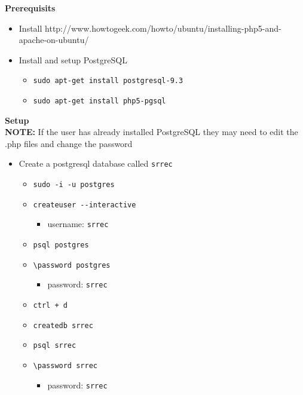 \documentclass[10pt, a4paper, onecolumn]{scrartcl}
\begin{document}
	\textbf{Prerequisits}
	
	\begin{itemize}[noitemsep]
		\item
		Install
		http://www.howtogeek.com/howto/ubuntu/installing-php5-and-apache-on-ubuntu/
		\item
		Install and setup PostgreSQL
		
		\begin{itemize}[noitemsep]
			\item
			\texttt{sudo\ apt-get\ install\ postgresql-9.3}
			\item
			\texttt{sudo\ apt-get\ install\ php5-pgsql}
		\end{itemize}
	\end{itemize}
	
	\textbf{Setup} \\
	
	\textbf{NOTE:} If the user has already installed PostgreSQL they may
	need to edit the .php files and change the password
	
	\begin{itemize}[noitemsep]
		\item
		Create a postgresql database called \texttt{srrec}
		
		\begin{itemize}[noitemsep]
			\item
			\texttt{sudo\ -i\ -u\ postgres}
			\item
			\texttt{createuser\ -\/-interactive}
			
			\begin{itemize}[noitemsep]
				\item
				username: \texttt{srrec}
			\end{itemize}
			\item
			\texttt{psql\ postgres}
			\item
			\texttt{\textbackslash{}password\ postgres}
			
			\begin{itemize}[noitemsep]
				\item
				password: \texttt{srrec}
			\end{itemize}
			\item
			\texttt{ctrl\ +\ d}
			\item
			\texttt{createdb\ srrec}
			\item
			\texttt{psql\ srrec}
			\item
			\texttt{\textbackslash{}password\ srrec}
			
			\begin{itemize}[noitemsep]
				\item
				password: \texttt{srrec}
			\end{itemize}
		\end{itemize}
	\end{itemize}
	
\end{document}
